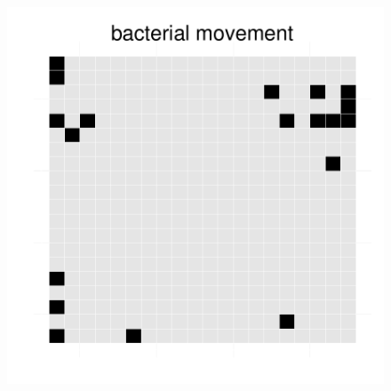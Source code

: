 \begin{figure}[h!]
{\begin{minipage}[t]{0.3\textwidth}
  \end{minipage}
  \begin{minipage}[t]{0.3\textwidth}
    \includegraphics[width=\textwidth]{../results/ecoli_20x20_aerob_seed55_bac50.pdf}
  \end{minipage}
  }
\end{figure}
